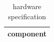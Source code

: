 \begin{table}[h]
\centering
\begin{tabular}{|c|}
\hline
component \\ \hline
\hline
\end{tabular}
\caption{hardware specification}
\label{tab:T17}
\end{table}
